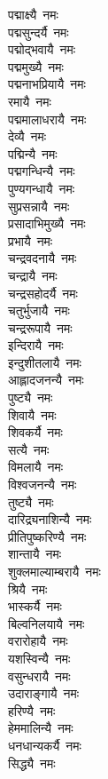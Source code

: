 \begin{multicols}{2}
\begin{flushleft}
पद्माक्ष्यै~नमः\\
पद्मसुन्दर्यै~नमः\\
पद्मोद्भवायै~नमः\\
पद्ममुख्यै~नमः\\
पद्मनाभप्रियायै~नमः\\
रमायै~नमः\\
पद्ममालाधरायै~नमः\\
देव्यै~नमः\hfill{}\\
पद्मिन्यै~नमः\\
पद्मगन्धिन्यै~नमः\\
पुण्यगन्धायै~नमः\\
सुप्रसन्नायै~नमः\\
प्रसादाभिमुख्यै~नमः\\
प्रभायै~नमः\\
चन्द्रवदनायै~नमः\\
चन्द्रायै~नमः\\
चन्द्रसहोदर्यै~नमः\\
चतुर्भुजायै~नमः\hfill{}\\
चन्द्ररूपायै~नमः\\
इन्दिरायै~नमः\\
इन्दुशीतलायै~नमः\\
आह्लादजनन्यै~नमः\\
पुष्ट्यै~नमः\\
शिवायै~नमः\\
शिवकर्यै~नमः\\
सत्यै~नमः\\
विमलायै~नमः\\
विश्वजनन्यै~नमः\hfill{}\\
तुष्ट्यै~नमः\\
दारिद्र्यनाशिन्यै~नमः\\
प्रीतिपुष्करिण्यै~नमः\\
शान्तायै~नमः\\
शुक्लमाल्याम्बरायै~नमः\\
श्रियै~नमः\\
भास्कर्यै~नमः\\
बिल्वनिलयायै~नमः\\
वरारोहायै~नमः\\
यशस्विन्यै~नमः\hfill{}\\
वसुन्धरायै~नमः\\
उदाराङ्गायै~नमः\\
हरिण्यै~नमः\\
हेममालिन्यै~नमः\\
धनधान्यकर्यै~नमः\\
सिद्ध्यै~नमः\\

\end{flushleft}
\end{multicols}
